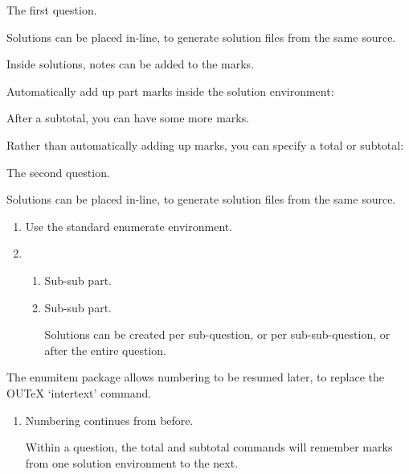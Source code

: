 \documentclass{ouexam}
\begin{document}
\maketitle


The first question.

\begin{solution}
Solutions can be placed in-line, to generate solution files from the same source.

Inside solutions, notes can be added to the marks.

Automatically add up part marks inside the solution environment:

\subtotal*

After a subtotal, you can have some more marks.

Rather than automatically adding up marks, you can specify a total or subtotal: 


\total*
\end{solution}

\question
The second question.

\begin{solution}
Solutions can be placed in-line, to generate solution files from the same source.
\end{solution}


\begin{enumerate}
\item Use the standard enumerate environment.
\item \begin{enumerate}
\item Sub-sub part.
\item Sub-sub part.
\begin{solution}
Solutions can be created per sub-question, or per sub-sub-question, or after the entire question.

\end{solution}
\end{enumerate}
\end{enumerate}
The enumitem package allows numbering to be resumed later, to replace the OUTeX `intertext' command.
\begin{enumerate}[resume]
\item Numbering continues from before.
\begin{solution}
Within a question, the total and subtotal commands will remember marks from one solution environment to the next.

\total*
\end{solution}
\end{enumerate}
\end{document}
